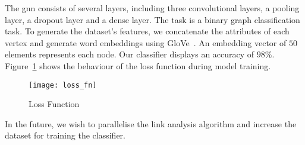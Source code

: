 The \gls{gnn} consists of several layers, including three convolutional layers, a pooling layer, a dropout layer and a dense layer. The task is a binary graph classification task. To generate the dataset's features, we concatenate the attributes of each vertex and generate word embeddings using GloVe~\cite{pennington-socher-manning:2014}. An embedding vector of $50$ elements represents each node. Our classifier displays an accuracy of $98\%$. Figure~\ref{fig:loss-fn} shows the behaviour of the loss function during model training.
\begin{figure}
  \begin{center}
    \texttt{[image: loss\_fn]}
  \end{center}
  \caption{Loss Function}\label{fig:loss-fn}
\end{figure}

In the future, we wish to parallelise the link analysis algorithm and increase the dataset for training the classifier.


